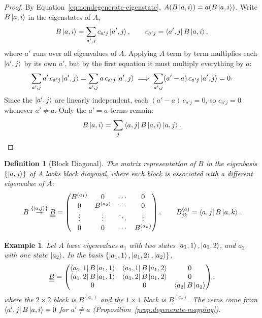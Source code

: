 \documentclass{article}
\newtheorem{definition}{Definition}
\newtheorem*{example}{Example}
\begin{document}
\begin{proof}
    By Equation~\eqref{eq:nondegenerate-eigenstate}, $A(B\ket{a,i}) = a(B\ket{a,i})$. Write $B\ket{a,i}$ in the eigenstates of $A$,
    \[B\ket{a,i} = \sum_{a',j} c_{a'j}\ket{a',j}, \qquad c_{a'j} = \bra{a',j}B\ket{a,i},\]
    where $a'$ runs over all eigenvalues of $A$. Applying $A$ term by term multiplies each $\ket{a',j}$ by its own $a'$, but by the first equation it must multiply everything by $a$:
    \[\sum_{a',j} a'\,c_{a'j}\ket{a',j} = \sum_{a',j} a\,c_{a'j}\ket{a',j} \implies \sum_{a',j}(a'-a)\,c_{a'j}\ket{a',j} = 0.\]
    Since the $\ket{a',j}$ are linearly independent, each $(a'-a)\,c_{a'j} = 0$, so $c_{a'j} = 0$ whenever $a' \neq a$. Only the $a' = a$ terms remain:
    \[B\ket{a,i} = \sum_j \bra{a,j}B\ket{a,i}\ket{a,j}.\]
\end{proof}
\begin{definition}[Block Diagonal]
    The matrix representation of $B$ in the eigenbasis $\{\ket{a,j}\}$ of $A$ looks block diagonal, where each block is associated with a different eigenvalue of $A$:
    \begin{equation}
        B \overset{\{\ket{a,j}\}}{\to} \underline{\underline{B}} = \begin{pmatrix}
            B^{(a_1)} & 0 & \cdots & 0 \\
            0 & B^{(a_2)} & \cdots & 0 \\
            \vdots & \vdots & \ddots & \vdots \\
            0 & 0 & \cdots & B^{(a_n)}
        \end{pmatrix}, \qquad B^{(a)}_{jk} = \bra{a,j}B\ket{a,k}.
    \end{equation}
\end{definition}
\begin{example}
    Let $A$ have eigenvalues $a_1$ with two states $\ket{a_1,1}, \ket{a_1,2}$, and $a_2$ with one state $\ket{a_2}$. In the basis $\{\ket{a_1,1}, \ket{a_1,2}, \ket{a_2}\}$,
    \begin{equation*}
        \underline{\underline{B}} = \begin{pmatrix}
            \bra{a_1,1}B\ket{a_1,1} & \bra{a_1,1}B\ket{a_1,2} & 0 \\
            \bra{a_1,2}B\ket{a_1,1} & \bra{a_1,2}B\ket{a_1,2} & 0 \\
            0 & 0 & \bra{a_2}B\ket{a_2}
        \end{pmatrix},
    \end{equation*}
    where the $2\times2$ block is $B^{(a_1)}$ and the $1\times1$ block is $B^{(a_2)}$. The zeros come from $\bra{a',j}B\ket{a,i} = 0$ for $a' \neq a$ (Proposition~\ref{prop:degenerate-mapping}).
\end{example}
\end{document}
